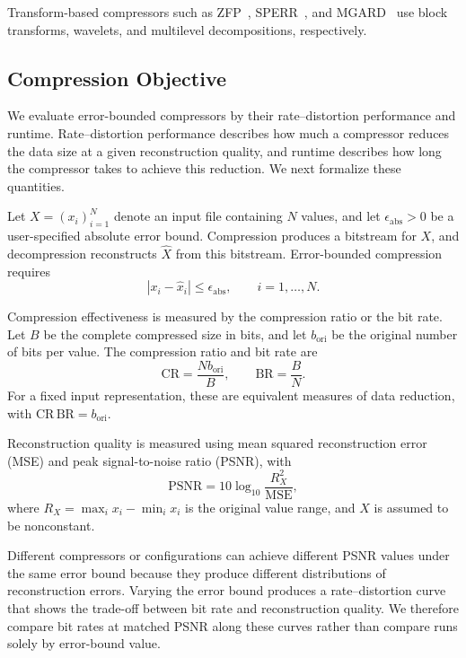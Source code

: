 Transform-based compressors such as ZFP~\cite{lindstrom2014fixed}, SPERR~\cite{li2023lossy}, and MGARD~\cite{gong2023mgard} use block transforms, wavelets, and multilevel decompositions, respectively.

\subsection{Compression Objective}
\label{sec:background:compression-objective}

We evaluate error-bounded compressors by their rate--distortion performance and runtime. Rate--distortion performance describes how much a compressor reduces the data size at a given reconstruction quality, and runtime describes how long the compressor takes to achieve this reduction. We next formalize these quantities.

Let $X=(x_i)_{i=1}^{N}$ denote an input file containing $N$ values, and let $\epsilon_{\mathrm{abs}}>0$ be a user-specified absolute error bound. Compression produces a bitstream for $X$, and decompression reconstructs $\hat X$ from this bitstream. Error-bounded compression requires
\begin{equation}
\label{eq:background:error-bound}
|x_i-\hat x_i|\leq\epsilon_{\mathrm{abs}},\qquad i=1,\ldots,N.
\end{equation}

Compression effectiveness is measured by the compression ratio or the bit rate. Let $B$ be the complete compressed size in bits, and let $b_{\mathrm{ori}}$ be the original number of bits per value. The compression ratio and bit rate are
\begin{equation}
\label{eq:background:rate}
\mathrm{CR}=\frac{Nb_{\mathrm{ori}}}{B},\qquad \mathrm{BR}=\frac{B}{N}.
\end{equation}
For a fixed input representation, these are equivalent measures of data reduction, with $\mathrm{CR}\,\mathrm{BR}=b_{\mathrm{ori}}$.

Reconstruction quality is measured using mean squared reconstruction error (MSE) and peak signal-to-noise ratio (PSNR), with
\begin{equation}
\label{eq:background:quality}
\mathrm{PSNR}=10\log_{10}\frac{R_X^2}{\mathrm{MSE}},
\end{equation}
where $R_X=\max_i x_i-\min_i x_i$ is the original value range, and $X$ is assumed to be nonconstant.

Different compressors or configurations can achieve different PSNR values under the same error bound because they produce different distributions of reconstruction errors. Varying the error bound produces a rate--distortion curve that shows the trade-off between bit rate and reconstruction quality. We therefore compare bit rates at matched PSNR along these curves rather than compare runs solely by error-bound value.

